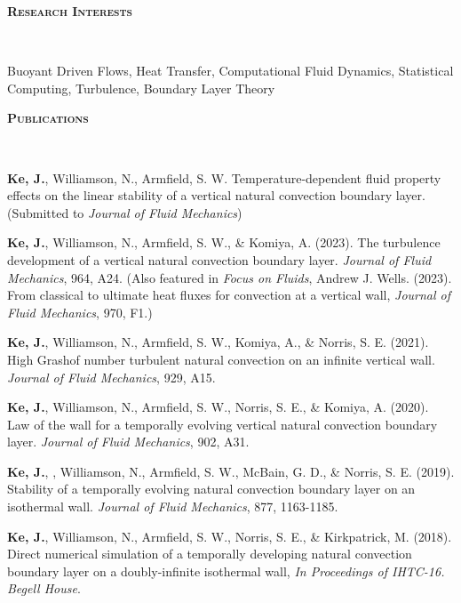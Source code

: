 \documentclass[letterpaper, 10pt]{article}
\newenvironment{changemargin}[2]{%
  \begin{list}{}{%
      \setlength{\topsep}{0pt}%
      \setlength{\leftmargin}{#1}%
      \setlength{\rightmargin}{#2}%
      \setlength{\listparindent}{\parindent}%
      \setlength{\itemindent}{\parindent}%
      \setlength{\parsep}{\parskip}%
    }%
  \item[]}{\end{list}
}
\newcommand{\lineover}{
  \begin{changemargin}{-0.05in}{-0.05in}
    \vspace*{-8pt}
    \hrulefill \\
    \vspace*{-2pt}
  \end{changemargin}
}
\newcommand{\header}[1]{
  \begin{changemargin}{-0.5in}{-0.5in}
    \textbf{\scshape{#1}}\\
    \lineover
  \end{changemargin}
}
\newenvironment{body} {
  \vspace*{-16pt}
  \begin{changemargin}{-0.25in}{-0.5in}
  }
  {\end{changemargin}
}
\begin{document}
\header{Research Interests}
Buoyant Driven Flows, Heat Transfer, Computational Fluid Dynamics, Statistical Computing, Turbulence, Boundary Layer Theory
\smallskip



\header{Publications}
\begin{body}
  \vspace{14pt}
  
  \textbf{Ke, J.}, Williamson, N., Armfield, S. W. Temperature-dependent fluid property effects on the linear stability of a vertical natural convection boundary layer. (Submitted to \emph{Journal of Fluid Mechanics})
  
  \smallskip
  
  \textbf{Ke, J.}, Williamson, N., Armfield, S. W., \& Komiya, A. (2023). The turbulence development of a vertical natural convection boundary layer. \emph{Journal of Fluid Mechanics}, 964, A24. (Also featured in \emph{Focus on Fluids}, Andrew J. Wells. (2023). From classical to ultimate heat fluxes for convection at a vertical wall, \emph{Journal of Fluid Mechanics}, 970, F1.)
  
  \smallskip
    
  \textbf{Ke, J.}, Williamson, N., Armfield, S. W., Komiya, A., \& Norris, S. E. (2021).  High Grashof number turbulent natural convection on an infinite vertical wall. \emph{Journal of Fluid Mechanics}, 929, A15.
  
  \smallskip
  
  \textbf{Ke, J.}, Williamson, N., Armfield, S. W., Norris, S. E., \& Komiya, A.  (2020). Law of the wall for a temporally evolving vertical natural convection boundary layer. \emph{Journal of Fluid Mechanics}, 902, A31.
  
  \smallskip

  \textbf{Ke, J.}, , Williamson, N., Armfield, S. W., McBain, G. D., \& Norris, S. E. (2019). Stability of a temporally evolving natural convection boundary layer on an isothermal wall. \emph{Journal of Fluid Mechanics}, 877, 1163-1185.

  \smallskip

  \textbf{Ke, J.}, Williamson, N., Armfield, S. W., Norris, S. E., \& Kirkpatrick, M. (2018). Direct numerical simulation of a temporally developing natural convection boundary layer on a doubly-infinite isothermal wall, \emph{In Proceedings of IHTC-16. Begell House}. %
  

\end{body}
\smallskip
\end{document}
